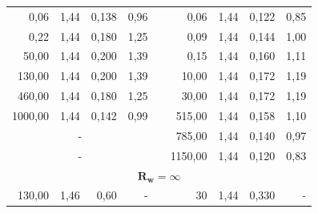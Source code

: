 \documentclass[a4paper,12pt]{article}
\begin{document}
\begin{table}[ht]
\begin{center}
\begin{tabular}{|r|r|r|r|r|r|r|r|r|}
    0,06 & 1,44 & 0,138 & 0,96 & & 0,06 & 1,44 & 0,122 & 0,85 \\ \cline{1-4} \cline{6-9}
    0,22 & 1,44 & 0,180 & 1,25 & & 0,09 & 1,44 & 0,144 & 1,00 \\ \cline{1-4} \cline{6-9}
    50,00 & 1,44 & 0,200 & 1,39 & & 0,15 & 1,44 & 0,160 & 1,11 \\ \cline{1-4} \cline{6-9}
    130,00 & 1,44 & 0,200 & 1,39 & & 10,00 & 1,44 & 0,172 & 1,19 \\ \cline{1-4} \cline{6-9}
    460,00 & 1,44 & 0,180 & 1,25 & & 30,00 & 1,44 & 0,172 & 1,19 \\ \cline{1-4} \cline{6-9}
    1000,00 & 1,44 & 0,142 & 0,99 & & 515,00 & 1,44 & 0,158 & 1,10 \\ \cline{1-4} \cline{6-9}
    \multicolumn{4}{|c|}{-} & & 785,00 & 1,44 & 0,140 & 0,97 \\ \cline{1-4} \cline{6-9}
    \multicolumn{4}{|c|}{-} & & 1150,00 & 1,44 & 0,120 & 0,83 \\ \hline
    \multicolumn{9}{|c|}{$\mathbf{R_w = \infty}$} \\ \hline
    130,00 & 1,46 & 0,60 & - & & 30 & 1,44 & 0,330 & - \\ \hline
    
  \end{tabular}
  \end{center}
  
\end{table}
\end{document}

